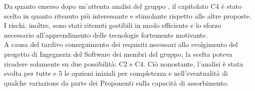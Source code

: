 Da quanto emerso dopo un'attenta analisi del gruppo \GRUPPO, il capitolato C4 è stato scelto in quanto ritenuto più interessante e stimolante rispetto alle altre proposte. I rischi, inoltre, sono stati ritenuti gestibili in modo efficiente e lo sforzo necessario all'apprendimento delle tecnologie fortemente motivante. \\ A causa del tardivo conseguimento dei requisiti necessari allo svolgimento del progetto di Ingegneria del Software dei membri del gruppo, la scelta poteva ricadere solamente su due possibilità: C2 e C4. Ciò nonostante, l'analisi è stata svolta per tutte e 5 le opzioni iniziali per completezza e nell'eventualità di qualche variazione da parte dei Proponenti sulla capacità di assorbimento.

